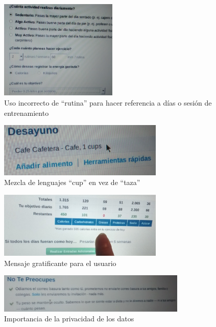 \documentclass[a4paper]{article}
\begin{document}
			\begin{figure}[!h]
				\centering
				\includegraphics[width=0.5\textwidth]{./figuras/marta1.jpg}
				\caption{Uso incorrecto de ``rutina'' para hacer referencia a días o sesión de entrenamiento}
			\end{figure}
			\begin{figure}[!h]
				\centering
				\includegraphics[width=0.7\textwidth]{./figuras/marta2.jpg}
				\caption{Mezcla de lenguajes ``cup'' en vez de ``taza''}
			\end{figure}
			\begin{figure}[!h]
				\centering
				\includegraphics[width=0.7\textwidth]{./figuras/marta3.jpg}
				\caption{Mensaje gratificante para el usuario}
			\end{figure}
			\begin{figure}[!h]
				\centering
				\includegraphics[width=0.8\textwidth]{./figuras/marta4.jpg}
				\caption{Importancia de la privacidad de los datos}
			\end{figure}
		\FloatBarrier
		
\end{document}

